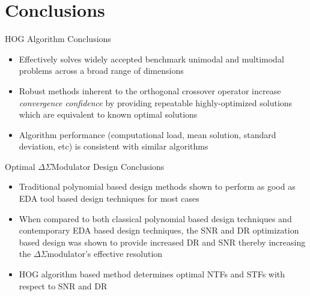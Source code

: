 \documentclass[
	style=aggie,
	mode=present,
	size=10pt,
	paper=screen,
	orient=landscape,
	display=slides,
]{powerdot}
\newcommand{\DS}		{$\Delta\Sigma$\space}
\begin{document}


\section[slide=true]{Conclusions}

\begin{slide}[toc=HOG Conclusions,bm=HOG Conclusions]{HOG Algorithm Conclusions}
	\vfill
	\begin{itemize}[type=1]
		\item Effectively solves widely accepted benchmark unimodal and multimodal
		problems across a broad range of dimensions \pause
		\vfill
		\item Robust methods inherent to the orthogonal crossover operator increase
		\textit{convergence confidence} by providing repeatable highly-optimized solutions
		which are equivalent to known optimal solutions \pause
		\vfill
		\item Algorithm performance (computational load, mean solution, standard
		deviation, etc) is consistent with similar algorithms 
	\end{itemize}
	\vfill \strut
\end{slide}

\begin{slide}[toc=DSM Conclusions,bm=DSM Conclusions]
{Optimal \DS Modulator Design Conclusions}
	\vfill
	\begin{itemize}[type=1]
		\item Traditional polynomial based design methods shown to perform as good as
		EDA tool based design techniques for most cases\pause
		\vfill
		\item When compared to both classical polynomial based design techniques and
		contemporary EDA based design techniques, the SNR and DR optimization based design
		was	shown to provide increased DR and SNR thereby increasing the \DS modulator’s
		effective resolution \pause
		\vfill
		\item HOG algorithm based method determines optimal NTFs and STFs with respect to
		SNR and DR
	\end{itemize}
	\vfill \strut
\end{slide}
\end{document}
